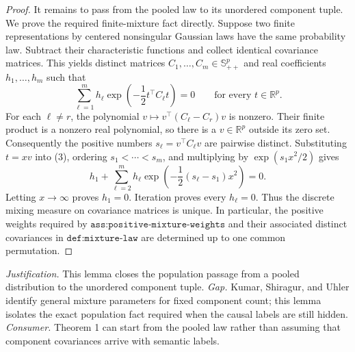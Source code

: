 \documentclass{article}
\begin{document}
\begin{proof}
It remains to pass from the pooled law to its unordered component tuple.
We prove the required finite-mixture fact directly.  Suppose two finite
representations by centered nonsingular Gaussian laws have the same
probability law.  Subtract their characteristic functions and collect
identical covariance matrices.  This yields distinct matrices
\(C_1,\ldots,C_m\in\mathbb S_{++}^p\) and real coefficients
\(h_1,\ldots,h_m\) such that
\[
 \sum_{\ell=1}^m h_\ell
 \exp\!\left(-\frac12 t^{\top}C_\ell t\right)=0
 \qquad\text{for every }t\in\mathbb R^p.                            \tag{3}
\]
For each \(\ell\neq r\), the polynomial
\(v\mapsto v^{\top}(C_\ell-C_r)v\) is nonzero.  Their finite product is a
nonzero real polynomial, so there is a \(v\in\mathbb R^p\) outside its
zero set.  Consequently the positive numbers
\(s_\ell=v^{\top}C_\ell v\) are pairwise distinct.  Substituting
\(t=xv\) into (3), ordering \(s_1<\cdots<s_m\), and multiplying by
\(\exp(s_1x^2/2)\) gives
\[
 h_1+\sum_{\ell=2}^m h_\ell
       \exp\!\left(-\frac12(s_\ell-s_1)x^2\right)=0 .
\]
Letting \(x\to\infty\) proves \(h_1=0\).  Iteration proves every
\(h_\ell=0\).  Thus the discrete mixing measure on covariance matrices is
unique.  In particular, the positive weights required by
\(\texttt{ass:positive-mixture-weights}\) and their associated distinct
covariances in \(\texttt{def:mixture-law}\) are determined up to one common
permutation.
\end{proof}
\par\smallskip\noindent \textit{Justification.} This lemma closes the population passage from a pooled distribution to the unordered component tuple. \textit{Gap.} Kumar, Shiragur, and Uhler identify general mixture parameters for fixed component count; this lemma isolates the exact population fact required when the causal labels are still hidden. \textit{Consumer.} Theorem 1 can start from the pooled law rather than assuming that component covariances arrive with semantic labels.
\end{document}
